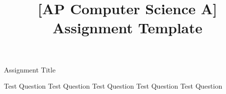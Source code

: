 \documentclass[11pt]{exam}
\title{[AP Computer Science A] Assignment Template}
\newcommand{\AssignmentTitle}{Assignment Title}
\newcommand{\ColorQuestion}[2]{\renewcommand{\questionlabel}{\colorbox{#1}{\color{white}\bfseries\thequestion}\hfill}\question #2}
\newcommand{\BlueQuestion}[1]{\ColorQuestion{RoyalBlue}{#1}}
\newcommand{\GreenQuestion}[1]{\ColorQuestion{ForestGreen}{#1}}
\newcommand{\YellowQuestion}[1]{\ColorQuestion{Goldenrod}{#1}}
\newcommand{\RedQuestion}[1]{\ColorQuestion{BrickRed}{#1}}
\newcommand{\PurpleQuestion}[1]{\ColorQuestion{RoyalPurple}{#1}}
\begin{document}
	\begin{center}
		\Large\AssignmentTitle
	\end{center}

	\begin{questions}
		\BlueQuestion{Test Question}
		\GreenQuestion{Test Question}
		\YellowQuestion{Test Question}
		\RedQuestion{Test Question}
		\PurpleQuestion{Test Question}
	\end{questions}
\end{document}
